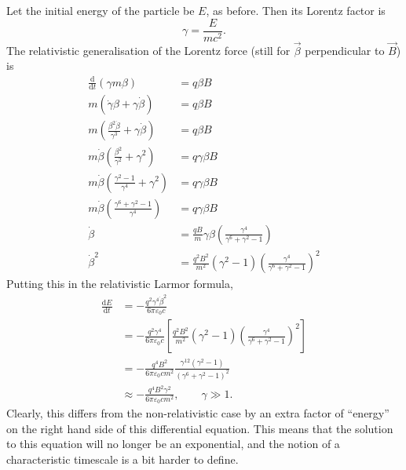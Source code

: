 \documentclass{book}
\newcommand{\deriv}[2]{\frac{\text{d}{#1}}{\text{d}{#2}}}
\begin{document}
Let the initial energy of the particle be $E$, as before.
Then its Lorentz factor is
\begin{equation}
    \gamma = \frac{E}{mc^2}.
\end{equation}
The relativistic generalisation of the Lorentz force (still for $\vec{\beta}$ perpendicular to $\vec{B}$) is
\begin{equation}
\begin{aligned}
    \deriv{}{t}(\gamma m \beta) &= q \beta B \\
    m\left(\dot{\gamma}\beta + \gamma\dot{\beta}\right) &= q \beta B \\
    m\left(\frac{\beta^2\dot{\beta}}{\gamma^3} + \gamma\dot{\beta}\right) &= q \beta B \\
    m\dot{\beta}\left(\frac{\beta^2}{\gamma^2} + \gamma^2\right) &= q \gamma \beta B \\
    m\dot{\beta}\left(\frac{\gamma^2 - 1}{\gamma^4} + \gamma^2\right) &= q \gamma \beta B \\
    m\dot{\beta}\left(\frac{\gamma^6 + \gamma^2 - 1}{\gamma^4}\right) &= q \gamma \beta B \\
    \dot{\beta} &= \frac{qB}{m}\gamma\beta\left(\frac{\gamma^4}{\gamma^6 + \gamma^2 - 1}\right) \\
    \dot{\beta}^2 &= \frac{q^2B^2}{m^2}(\gamma^2 - 1)\left(\frac{\gamma^4}{\gamma^6 + \gamma^2 - 1}\right)^2
\end{aligned}
\end{equation}
Putting this in the relativistic Larmor formula,
\begin{equation}
\begin{aligned}
    \deriv{E}{t}
        &= -\frac{q^2\gamma^4\dot{\beta}^2}{6\pi\varepsilon_0 c} \\
        &= -\frac{q^2\gamma^4}{6\pi\varepsilon_0 c} \left[\frac{q^2B^2}{m^2}
            (\gamma^2 - 1)\left(\frac{\gamma^4}{\gamma^6 + \gamma^2 - 1}\right)^2\right] \\
        &= -\frac{q^4B^2}{6\pi\varepsilon_0 c m^2}
            \frac{\gamma^{12}(\gamma^2 - 1)}{(\gamma^6 + \gamma^2 - 1)^2} \\
        &\approx -\frac{q^4B^2\gamma^2}{6\pi\varepsilon_0 c m^2}, \qquad \gamma \gg 1.
\end{aligned}
\end{equation}
Clearly, this differs from the non-relativistic case by an extra factor of ``energy'' on the right hand side of this differential equation.
This means that the solution to this equation will no longer be an exponential, and the notion of a characteristic timescale is a bit harder to define.
\end{document}
